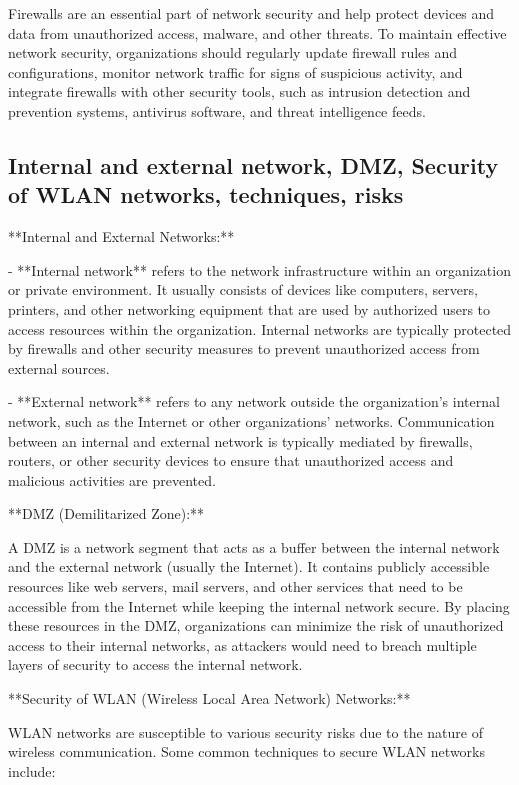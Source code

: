 \documentclass{article}
\begin{document}
Firewalls are an essential part of network security and help protect devices and data from unauthorized access, malware, and other threats. To maintain effective network security, organizations should regularly update firewall rules and configurations, monitor network traffic for signs of suspicious activity, and integrate firewalls with other security tools, such as intrusion detection and prevention systems, antivirus software, and threat intelligence feeds.


\subsection{Internal and external network, DMZ, Security of WLAN networks, techniques, risks}

**Internal and External Networks:**

- **Internal network** refers to the network infrastructure within an organization or private environment. It usually consists of devices like computers, servers, printers, and other networking equipment that are used by authorized users to access resources within the organization. Internal networks are typically protected by firewalls and other security measures to prevent unauthorized access from external sources.

- **External network** refers to any network outside the organization's internal network, such as the Internet or other organizations' networks. Communication between an internal and external network is typically mediated by firewalls, routers, or other security devices to ensure that unauthorized access and malicious activities are prevented.

**DMZ (Demilitarized Zone):**

A DMZ is a network segment that acts as a buffer between the internal network and the external network (usually the Internet). It contains publicly accessible resources like web servers, mail servers, and other services that need to be accessible from the Internet while keeping the internal network secure. By placing these resources in the DMZ, organizations can minimize the risk of unauthorized access to their internal networks, as attackers would need to breach multiple layers of security to access the internal network.

**Security of WLAN (Wireless Local Area Network) Networks:**

WLAN networks are susceptible to various security risks due to the nature of wireless communication. Some common techniques to secure WLAN networks include:
\end{document}
